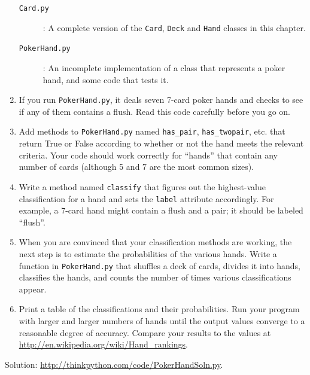 \documentclass[10pt]{book}
\begin{document}
\begin{exercise}
\begin{enumerate}
\begin{description}

\item[{\tt Card.py}]: A complete version of the {\tt Card},
{\tt Deck} and {\tt Hand} classes in this chapter.

\item[{\tt PokerHand.py}]: An incomplete implementation of a class
that represents a poker hand, and some code that tests it.

\end{description}
%
\item If you run {\tt PokerHand.py}, it deals seven 7-card poker hands
and checks to see if any of them contains a flush.  Read this
code carefully before you go on.

\item Add methods to {\tt PokerHand.py} named \verb"has_pair",
\verb"has_twopair", etc. that return True or False according to
whether or not the hand meets the relevant criteria.  Your code should
work correctly for ``hands'' that contain any number of cards
(although 5 and 7 are the most common sizes).

\item Write a method named {\tt classify} that figures out
the highest-value classification for a hand and sets the
{\tt label} attribute accordingly.  For example, a 7-card hand
might contain a flush and a pair; it should be labeled ``flush''.

\item When you are convinced that your classification methods are
working, the next step is to estimate the probabilities of the various
hands.  Write a function in {\tt PokerHand.py} that shuffles a deck of
cards, divides it into hands, classifies the hands, and counts the
number of times various classifications appear.

\item Print a table of the classifications and their probabilities.
Run your program with larger and larger numbers of hands until the
output values converge to a reasonable degree of accuracy.  Compare
your results to the values at \url{http://en.wikipedia.org/wiki/Hand_rankings}.

\end{enumerate}

Solution: \url{http://thinkpython.com/code/PokerHandSoln.py}.
\end{exercise}
\end{document}
